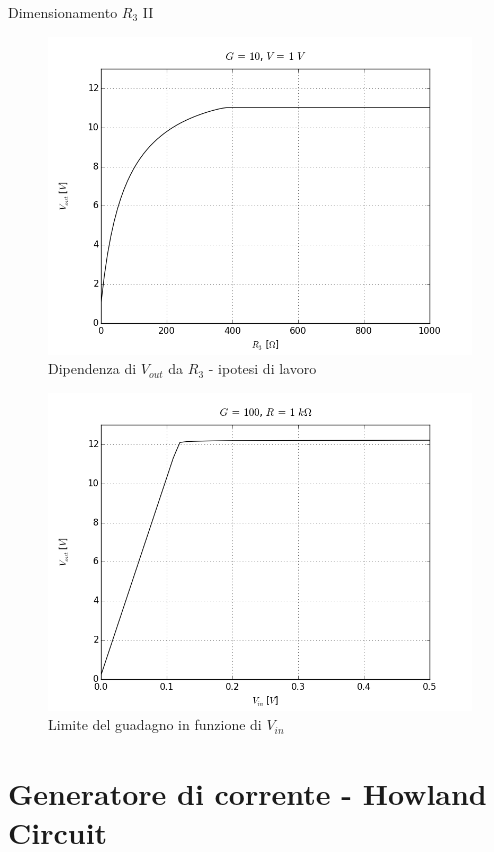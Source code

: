 \documentclass{beamer}
\begin{document}
\begin{frame}{Dimensionamento $R_3$ II}

\begin{figure}
\centering
\includegraphics[width=0.7\linewidth]{./g_10_v_1_dc_r}
\caption{Dipendenza di $V_{out} $ da $R_3$ - ipotesi di lavoro}
\label{fig:g_10_v_1_dc_r}
\end{figure}

\end{frame}

\begin{frame}

{
\centering
\begin{figure}
\centering
\includegraphics[width=0.7\linewidth]{./g_100_r_1k_dc_v}
\caption{Limite del guadagno in funzione di $V_{in}$}
\label{fig:g_100_r_1k_dc_v}
\end{figure}



}


\end{frame}


\section{Generatore di corrente - Howland Circuit}
\end{document}
